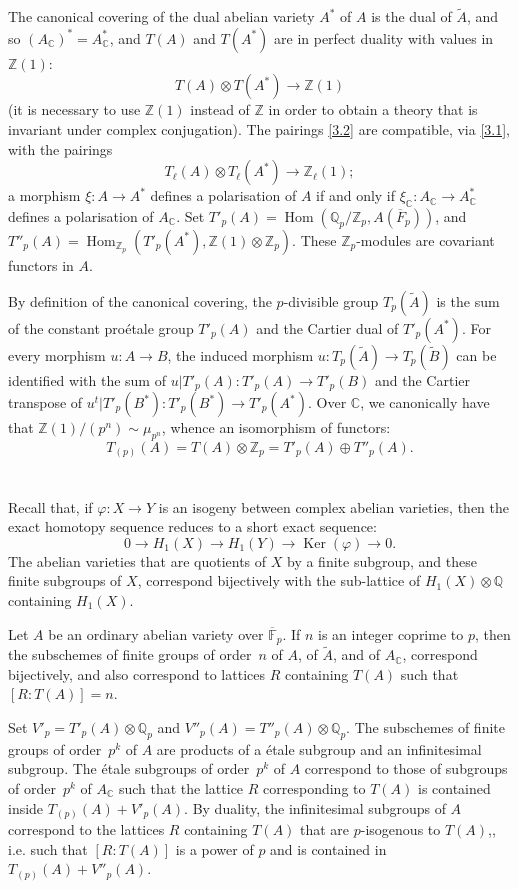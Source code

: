 \documentclass{article}
\newcommand{\FF}{\mathbb{F}}
\newcommand{\ZZ}{\mathbb{Z}}
\newcommand{\QQ}{\mathbb{Q}}
\newcommand{\CC}{\mathbb{C}}
\DeclareMathOperator{\Hom}{Hom}
\DeclareMathOperator{\Ker}{Ker}
\newcommand{\oldpage}[1]{\marginpar{\footnotesize$\Big\vert$ \textit{p.~#1}}}
\begin{document}
The canonical covering of the dual abelian variety $A^*$ of $A$ is the dual of $\widetilde{A}$, and so $(A_\CC)^*=A_\CC^*$, and $T(A)$ and $T(A^*)$ are in perfect duality with values in $\ZZ(1)$:
\[
\label{3.2}
  T(A)\otimes T(A^*) \to \ZZ(1)
\tag{3.2}
\]
(it is necessary to use $\ZZ(1)$ instead of $\ZZ$ in order to obtain a theory that is invariant under complex conjugation).
The pairings \cref{3.2} are compatible, via \cref{3.1}, with the pairings
\[
  T_\ell(A)\otimes T_\ell(A^*) \to \ZZ_\ell(1);
\]
a morphism $\xi\colon A\to A^*$ defines a polarisation of $A$ if and only if $\xi_\CC\colon A_\CC\to A_\CC^*$ defines a polarisation of $A_\CC$.
Set $T'_p(A) = \Hom(\QQ_p/\ZZ_p,A(\overline{F}_p))$, and $T''_p(A) = \Hom_{\ZZ_p}(T'_p(A^*),\ZZ(1)\otimes\ZZ_p)$.
These $\ZZ_p$-modules are covariant functors in $A$.

By definition of the canonical covering, the $p$-divisible group $T_p(\widetilde{A})$ is the sum of the constant pro\'{e}tale group $T'_p(A)$ and the Cartier dual of $T'_p(A^*)$.
For every morphism $u\colon A\to B$, the induced morphism $u\colon T_p(\widetilde{A})\to T_p(\widetilde{B})$ can be identified with the sum of $u|T'_p(A)\colon T'_p(A)\to T'_p(B)$ and the Cartier transpose of $u^t|T'_p(B^*)\colon T'_p(B^*)\to T'_p(A^*)$.
Over $\CC$, we canonically have that $\ZZ(1)/(p^n)\sim\mu_{p^n}$, whence an isomorphism of functors:
\[
\label{3.3}
  T_{(p)}(A) = T(A)\otimes\ZZ_p = T'_p(A)\oplus T''_p(A).
\tag{3.3}
\]


\section{}
\label{4}
Recall that, if $\varphi\colon X\to Y$ is an isogeny between complex abelian varieties, then the exact homotopy sequence reduces to a short exact sequence:
\[
  0 \to H_1(X) \to H_1(Y) \to \Ker(\varphi) \to 0.
\]
\oldpage{240}
The abelian varieties that are quotients of $X$ by a finite subgroup, and these finite subgroups of $X$, correspond bijectively with the sub-lattice of $H_1(X)\otimes\QQ$ containing $H_1(X)$.

Let $A$ be an ordinary abelian variety over $\overline{\FF}_p$.
If $n$ is an integer coprime to $p$, then the subschemes of finite groups of order~$n$ of $A$, of $\widetilde{A}$, and of $A_\CC$, correspond bijectively, and also correspond to lattices $R$ containing $T(A)$ such that $[R:T(A)]=n$.

Set $V'_p=T'_p(A)\otimes\QQ_p$ and $V''_p(A)=T''_p(A)\otimes\QQ_p$.
The subschemes of finite groups of order~$p^k$ of $A$ are products of a \'{e}tale subgroup and an infinitesimal subgroup.
The \'{e}tale subgroups of order~$p^k$ of $A$ correspond to those of subgroups of order~$p^k$ of $A_\CC$ such that the lattice $R$ corresponding to $T(A)$ is contained inside $T_{(p)}(A)+V'_p(A)$.
By duality, the infinitesimal subgroups of $A$ correspond to the lattices $R$ containing $T(A)$ that are $p$-isogenous to $T(A)$,, i.e. such that $[R:T(A)]$ is a power of $p$ and is contained in $T_{(p)}(A)+V''_p(A)$.
\end{document}
